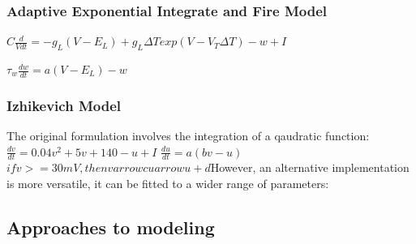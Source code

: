 \subsubsection{Adaptive Exponential Integrate and Fire Model}
\begin{center}
$C\frac{d}{Vdt}=-g_{L}(V-E_{L})+
g_{L} \Delta Texp(V-V_{T} \Delta T)-w+I$

$\tau_{w}\frac{dw}{dt} = a(V-E_{L})-w $
\end{center}
\subsubsection{Izhikevich Model}
The original formulation involves the integration of a qaudratic function:
$\frac{dv}{dt}=0.04v^{2}+5v+140-u+I$
$\frac{du}{dt} = a(bv-u)$
$if v>=30mV,
then v arrow c u arrow u+ d$However, an alternative implementation is more versatile, it can be fitted to a wider range of parameters:

\subsection{Approaches to modeling}


%

